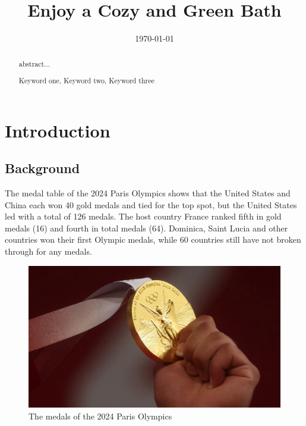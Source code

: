 \documentclass{mcmthesis}
\title{Enjoy a Cozy and Green Bath}
\date{\today}
\begin{document}
	
	\begin{abstract}
		
		abstract...
		
		\begin{keywords}
			Keyword one, Keyword two, Keyword three
		\end{keywords}
		
	\end{abstract}
	
	
	\maketitle
	\tableofcontents        %
	\thispagestyle{empty}
	\newpage
	
	
	
	
	
	
	
	\section{Introduction}
	
	\subsection{Background}
	The medal table of the 2024 Paris Olympics shows that the United States and China each won 40 gold medals and tied for the top spot, but the United States led with a total of 126 medals. The host country France ranked fifth in gold medals (16) and fourth in total medals (64). Dominica, Saint Lucia and other countries won their first Olympic medals, while 60 countries still have not broken through for any medals.
	\begin{figure}[htbp]
		\centering
		\includegraphics[width=0.7\linewidth]{fig/background}
		\caption{The medals of the 2024 Paris Olympics}
	\end{figure}
	
\end{document}
